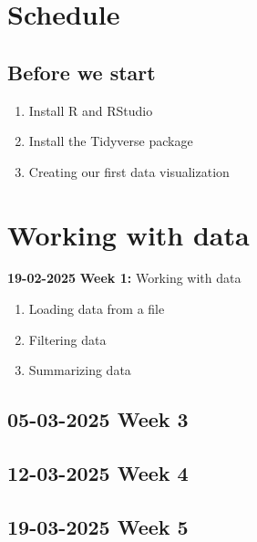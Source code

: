 \documentclass{article}
\newcommand{\week}[3]{
    \begin{center}
        \textbf{#1} \dotfill \textbf{#2:} #3
    \end{center}
}
\begin{document}
\section*{Schedule}

\subsection*{Before we start}
\begin{enumerate}
    \item Install R and RStudio
    \item Install the Tidyverse package
    \item Creating our first data visualization
\end{enumerate}

\section{Working with data}


\week{19-02-2025}{Week 1}{Working with data}

\begin{enumerate}
    \item Loading data from a file
    \item Filtering data
    \item Summarizing data
\end{enumerate}





\subsection*{05-03-2025 \textbf{Week 3}}

\subsection*{12-03-2025 \textbf{Week 4}}
\subsection*{19-03-2025 \textbf{Week 5}}
\end{document}
